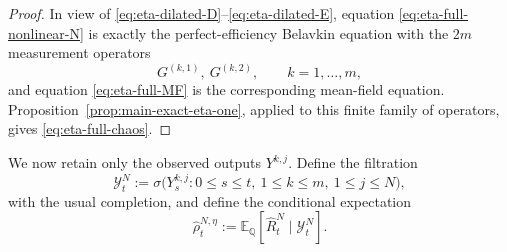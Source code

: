 \documentclass[10pt,a4paper,reqno]{amsart}
\numberwithin{equation}{section}
\theoremstyle{plain}
\theoremstyle{definition}
\theoremstyle{remark}
\newcommand{\E}{\mathbb E}
\newcommand{\Q}{\mathbb Q}
\newcommand{\cY}{\mathcal Y}
\newcommand{\1}{\mathbf 1}
\begin{document}
\begin{proof}
In view of \eqref{eq:eta-dilated-D}--\eqref{eq:eta-dilated-E}, equation
\eqref{eq:eta-full-nonlinear-N} is exactly the perfect-efficiency Belavkin equation
with the \(2m\) measurement operators
\[
  G^{(k,1)},\ G^{(k,2)},
  \qquad
  k=1,\ldots, m, 
\]
and equation \eqref{eq:eta-full-MF} is the corresponding mean-field equation.
Proposition~\ref{prop:main-exact-eta-one}, applied to this finite family of
operators, gives \eqref{eq:eta-full-chaos}.
\end{proof}

We now retain only the observed outputs \(Y^{k,j}\).  Define the filtration 
\begin{equation}
  \cY_t^N
  :=
  \sigma\bigl(
    Y_s^{k,j}:
    0\le s\le t,\ 1\le k\le m,\ 1\le j\le N
  \bigr),
  \label{eq:eta-YN-def}
\end{equation}
with the usual completion, and define the conditional expectation
\begin{equation}
  \widehat\rho_t^{N,\eta}
  :=
  \E_{\Q}
  \left[
    \widehat R_t^N\mid\cY_t^N
  \right].
  \label{eq:eta-hat-rho-conditional}
\end{equation}
\end{document}
